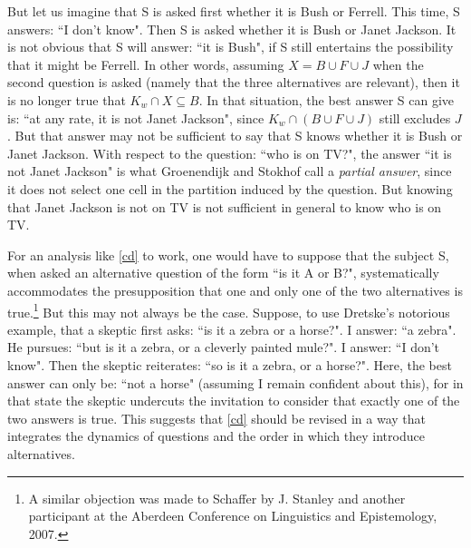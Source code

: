 But let us imagine that S is asked first whether it is Bush or
Ferrell. This time, S answers: ``I don't know". Then S is asked
whether it is Bush or Janet Jackson. It is not obvious that S will
answer: ``it is Bush", if S still entertains the possibility that
it might be Ferrell. In other words, assuming $X=B\cup F\cup J$
when the second question is asked (namely that the three
alternatives are relevant), then it is no longer true that $K_w
\cap X \subseteq B$. In that situation, the best answer S can give
is: ``at any rate, it is not Janet Jackson", since $K_w \cap
(B\cup F\cup J)$ still excludes $J$. But that answer may not be
sufficient to say that S knows whether it is Bush or Janet
Jackson. With respect to the question: ``who is on TV?", the
answer ``it is not Janet Jackson" is what Groenendijk and Stokhof
call a \emph{partial answer}, since it does not select one cell in
the partition induced by the question. But knowing that Janet
Jackson is not on TV is not sufficient in general to know who is
on TV.



For an analysis like \ref{cd} to work, one would have to suppose
that the subject S, when asked an alternative question of the form
``is it A or B?", systematically accommodates the presupposition
that one and only one of the two alternatives is true.\footnote{A
similar objection was made to Schaffer by J. Stanley and another
participant at the Aberdeen Conference on Linguistics and
Epistemology, 2007.} But this may not always be the case. Suppose,
to use Dretske's notorious example, that a skeptic first asks:
``is it a zebra or a horse?". I answer: ``a zebra". He pursues:
``but is it a zebra, or a cleverly painted mule?". I answer: ``I
don't know". Then the skeptic reiterates: ``so is it a zebra, or a
horse?". Here, the best answer can only be: ``not a horse"
(assuming I remain confident about this), for in that state the
skeptic undercuts the invitation to consider that exactly one of
the two answers is true. This suggests that \ref{cd} should be
revised in a way that integrates the dynamics of questions and the
order in which they introduce alternatives.

